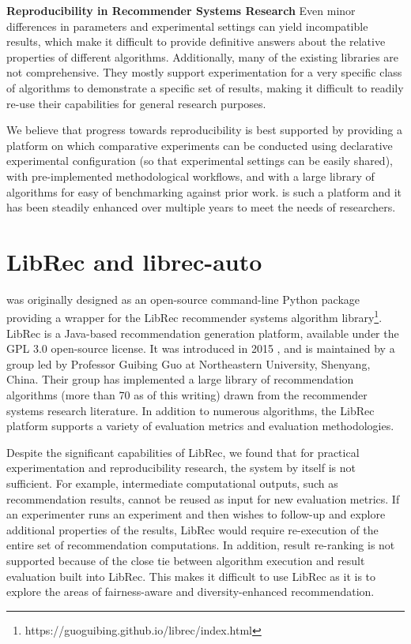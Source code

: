 \textbf{Reproducibility in Recommender Systems Research}
Even minor differences in parameters and experimental settings can yield incompatible results, which make it difficult to provide definitive answers about the relative properties of different algorithms. Additionally, many of the existing libraries are not comprehensive. They mostly support experimentation for a very specific class of algorithms to demonstrate a specific set of results, making it difficult to readily re-use their capabilities for general research purposes. 

We believe that progress towards reproducibility is best supported by providing a platform on which comparative experiments can be conducted using declarative experimental configuration (so that experimental settings can be easily shared), with pre-implemented methodological workflows, and with a large library of algorithms for easy of benchmarking against prior work. \libauto{} is such a platform and it has been steadily enhanced over multiple years to meet the needs of researchers.


\section{LibRec and librec-auto}
\label{sec:libauto}

\libauto{} was originally designed as an open-source command-line Python package providing a wrapper for the LibRec recommender systems algorithm library\footnote{https://guoguibing.github.io/librec/index.html}. LibRec is a Java-based recommendation generation platform, available under the GPL 3.0 open-source license. It was introduced in 2015 \cite{guo2015librec}, and is maintained by a group led by Professor Guibing Guo at Northeastern University, Shenyang, China. Their group has implemented a large library of recommendation algorithms (more than 70 as of this writing) drawn from the recommender systems research literature. In addition to numerous algorithms, the LibRec platform supports a variety of evaluation metrics and evaluation methodologies.

Despite the significant capabilities of LibRec, we found that for practical experimentation and reproducibility research, the system by itself is not sufficient. For example, intermediate computational outputs, such as recommendation results, cannot be reused as input for new evaluation metrics. If an experimenter runs an experiment and then wishes to follow-up and explore additional properties of the results, LibRec would require re-execution of the entire set of recommendation computations. In addition, result re-ranking is not supported because of the close tie between algorithm execution and result evaluation built into LibRec. This makes it difficult to use LibRec as it is to explore the areas of fairness-aware and diversity-enhanced recommendation.

